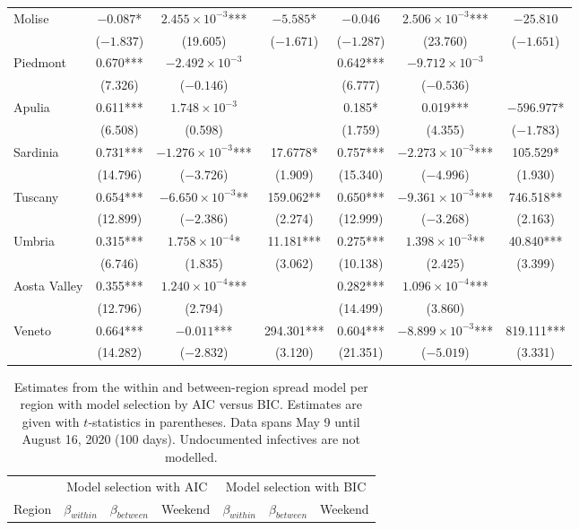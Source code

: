 \documentclass[12pt]{article}
\begin{document}
\begin{appendices}
\begin{longtable}{@{}lcccccc@{}}
            Molise & $-0.087$* & $2.455 \times 10^{-3}$*** & $-5.585$* & $-0.046$ & $2.506 \times 10^{-3}$*** & $-25.810$ \\ 
             & ($-1.837$) & (19.605) & ($-1.671$) & ($-1.287$) & (23.760) & ($-1.651$) \\ 
            Piedmont & 0.670*** & $-2.492 \times 10^{-3}$ &  & 0.642*** & $-9.712 \times 10^{-3}$ &  \\ 
             & (7.326) & ($-0.146$) &  & (6.777) & ($-0.536$) &  \\ 
            Apulia & 0.611*** & $1.748 \times 10^{-3}$ &  & 0.185* & 0.019*** & $-596.977$* \\ 
             & (6.508) & (0.598) &  & (1.759) & (4.355) & ($-1.783$) \\ 
            Sardinia & 0.731*** & $-1.276 \times 10^{-3}$*** & 17.6778* & 0.757*** & $-2.273 \times 10^{-3}$*** & 105.529* \\ 
             & (14.796) & ($-3.726$) & (1.909) & (15.340) & ($-4.996$) & (1.930) \\ 
            Tuscany & 0.654*** & $-6.650 \times 10^{-3}$** & 159.062** & 0.650*** & $-9.361 \times 10^{-3}$*** & 746.518** \\ 
             & (12.899) & ($-2.386$) & (2.274) & (12.999) & ($-3.268$) & (2.163) \\ 
            Umbria & 0.315*** & $1.758 \times 10^{-4}$* & 11.181*** & 0.275*** & $1.398 \times 10^{-3}$** & 40.840*** \\ 
             & (6.746) & (1.835) & (3.062) & (10.138) & (2.425) & (3.399) \\ 
            Aosta Valley & 0.355*** & $1.240 \times 10^{-4}$*** &  & 0.282*** & $1.096 \times 10^{-4}$*** &  \\ 
             & (12.796) & (2.794) &  & (14.499) & (3.860) &  \\ 
            Veneto & 0.664*** & $-0.011$*** & 294.301*** & 0.604*** & $-8.899 \times 10^{-3}$*** & 819.111*** \\ 
             & (14.282) & ($-2.832$) & (3.120) & (21.351) & ($-5.019$) & (3.331) \\* \bottomrule
    	\end{longtable}
		
		\begin{longtable}{@{}lcccccc@{}}
    		\caption{Estimates from the within and between-region spread model per region with model selection by AIC versus BIC. Estimates are given with $t$-statistics in parentheses. Data spans May 9 until August 16, 2020 (100 days). Undocumented infectives are not modelled.}
    		\label{tab:results_between_aic_vs_bic}\\
    		\toprule
    		                & \multicolumn{3}{c}{Model selection with AIC} & \multicolumn{3}{c}{Model selection with BIC} \\
    		                \cmidrule(lr){2-4}
                            \cmidrule(lr){5-7}
    		Region          & $\beta_{within}$ & $\beta_{between}$ & Weekend & $\beta_{within}$ & $\beta_{between}$ & Weekend \\* \midrule
    		\endfirsthead
    		

\end{longtable}
\end{appendices}
\end{document}
